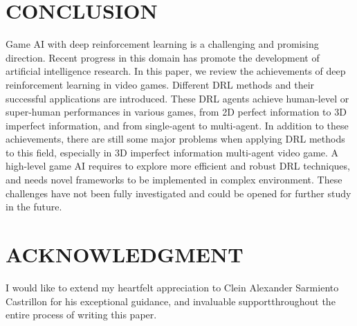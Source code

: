 \documentclass{article}
\begin{document}
\section{CONCLUSION}
Game AI with deep reinforcement learning is a challenging
and promising direction. Recent progress in this domain has promote the development of artificial intelligence research. In this paper, we review the achievements of deep reinforcement learning in video games. Different DRL methods and their successful applications are introduced. These DRL agents achieve human-level or super-human performances in various games, from 2D perfect information to 3D imperfect information, and from single-agent to multi-agent. In addition to these achievements, there are still some major problems when
applying DRL methods to this field, especially in 3D imperfect information multi-agent video game. A high-level game AI requires to explore more efficient and robust DRL techniques, and needs novel frameworks to be implemented in complex environment. These challenges have not been fully investigated and could be opened for further study in the future.

\section*{ACKNOWLEDGMENT}
I would like to extend my heartfelt appreciation to Clein Alexander Sarmiento Castrillon for his exceptional guidance, and invaluable supportthroughout the entire process of writing this paper.

\newpage


\end{document}
